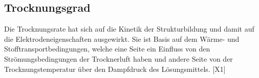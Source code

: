 \documentclass[12pt,UTF8]{article}
\begin{document}
\subsection{Trocknungsgrad}
Die Trocknungsrate hat sich auf die Kinetik der Strukturbildung und damit auf die Elektrodeneigenschaften ausgewirkt. Sie ist Basis auf dem Wärme- und Stofftransportbedingungen, welche eine Seite ein Einfluss von den Strömungsbedingungen der Trocknerluft haben und andere Seite von der Trocknungstemperatur über den Dampfdruck des Lösungsmittels. [X1]



\newpage
\end{document}
